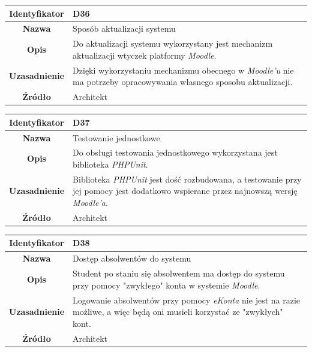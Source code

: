 \begin{table}[H]
\centering
\begin{tabular}{ | >{\bfseries}c | p{11cm} | }
\hline
%
Identyfikator & D36 \\ \hline
Nazwa & Sposób aktualizacji systemu \\ \hline
Opis & Do aktualizacji systemu wykorzystany jest mechanizm aktualizacji wtyczek platformy \textit{Moodle}. \\ \hline
Uzasadnienie & Dzięki wykorzystaniu mechanizmu obecnego w \textit{Moodle'u} nie ma potrzeby opracowywania własnego sposobu aktualizacji. \\ \hline
Źródło & Architekt \\ \hline
%
\end{tabular}
\end{table}

\begin{table}[H]
\centering
\begin{tabular}{ | >{\bfseries}c | p{11cm} | }
\hline
%
Identyfikator & D37 \\ \hline
Nazwa & Testowanie jednostkowe \\ \hline
Opis & Do obsługi testowania jednostkowego wykorzystana jest biblioteka \textit{PHPUnit}.  \\ \hline
Uzasadnienie & Biblioteka \textit{PHPUnit} jest dość rozbudowana, a testowanie przy jej pomocy jest dodatkowo wspierane przez najnowszą wersję \textit{Moodle'a}. \\ \hline
Źródło & Architekt \\ \hline
%
\end{tabular}
\end{table}

\begin{table}[H]
\centering
\begin{tabular}{ | >{\bfseries}c | p{11cm} | }
\hline
%
Identyfikator & D38 \\ \hline
Nazwa & Dostęp absolwentów do systemu \\ \hline
Opis & Student po staniu się absolwentem ma dostęp do systemu przy pomocy "zwykłego" konta w systemie \textit{Moodle}. \\ \hline
Uzasadnienie & Logowanie absolwentów przy pomocy \textit{eKonta} nie jest na razie możliwe, a więc będą oni musieli korzystać ze "zwykłych" kont. \\ \hline
Źródło & Architekt \\ \hline
%
\end{tabular}
\end{table}


